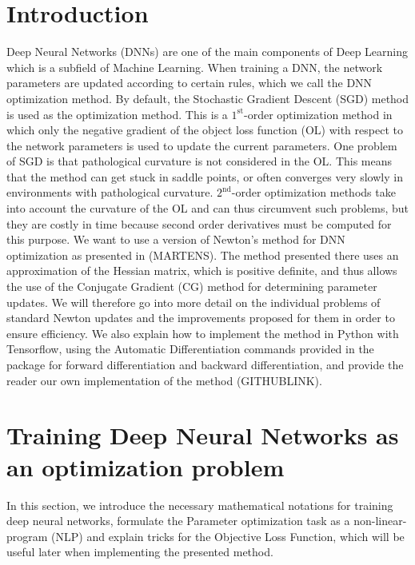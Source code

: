 \documentclass[conference]{IEEEtran}
\begin{document}
\section{Introduction} 
Deep Neural Networks (DNNs) are one of the main components of Deep Learning which is a subfield of Machine Learning. When training a DNN, the network parameters are updated according to certain rules, which we call the DNN optimization method. By default, the Stochastic Gradient Descent (SGD) method is used as the optimization method. This is a $1^{\text{st}}$-order optimization method in which only the negative gradient of the object loss function (OL) with respect to the network parameters is used to update the current parameters.
One problem of SGD is that pathological curvature is not considered in the OL. This means that the method can get stuck in saddle points, or often converges very slowly in environments with pathological curvature. 
$2^{\text{nd}}$-order optimization methods take into account the curvature of the OL and can thus circumvent such problems, but they are costly in time because second order derivatives must be computed for this purpose. 
We want to use a version of Newton's method for DNN optimization as presented in (MARTENS).
The method presented there uses an approximation of the Hessian matrix, which is positive definite, and thus allows the use of the Conjugate Gradient (CG) method for determining parameter updates. We will therefore go into more detail on the individual problems of standard Newton updates and the improvements proposed for them in order to ensure efficiency.
We also explain how to implement the method in Python with Tensorflow, using the Automatic Differentiation commands provided in the package for forward differentiation and backward differentiation, and provide the reader our own implementation of the method (GITHUBLINK). 


\section{Training Deep Neural Networks as an optimization problem}
In this section, we introduce the necessary mathematical notations for training deep neural networks, formulate the Parameter optimization task as a non-linear-program (NLP) and explain tricks for the Objective Loss Function, which will be useful later when implementing the presented method.\\
\end{document}

